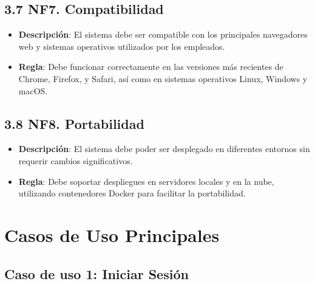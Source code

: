 \documentclass{article}
\begin{document}
\subsection{3.7 NF7. Compatibilidad}
\begin{itemize}
    \item \textbf{Descripción}: El sistema debe ser compatible con los principales navegadores web y sistemas operativos utilizados por los empleados.
    \item \textbf{Regla}: Debe funcionar correctamente en las versiones más recientes de Chrome, Firefox, y Safari, así como en sistemas operativos Linux, Windows y macOS.
\end{itemize}

\subsection{3.8 NF8. Portabilidad}
\begin{itemize}
    \item \textbf{Descripción}: El sistema debe poder ser desplegado en diferentes entornos sin requerir cambios significativos.
    \item \textbf{Regla}: Debe soportar despliegues en servidores locales y en la nube, utilizando contenedores Docker para facilitar la portabilidad.
\end{itemize}

\newpage
\section{Casos de Uso Principales}
\subsection{Caso de uso 1: Iniciar Sesión}
\end{document}
